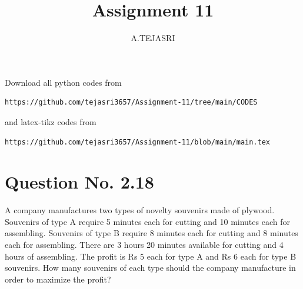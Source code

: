 \documentclass[journal,12pt,twocolumn]{IEEEtran}
\begin{document}
\makeatother
\let\StandardTheFigure\thefigure
\let\vec\mathbf
\renewcommand{\thefigure}{\theproblem}
\def\putbox#1#2#3{\makebox[0in][l]{\makebox[#1][l]{}\raisebox{\baselineskip}[0in][0in]{\raisebox{#2}[0in][0in]{#3}}}}
     \def\rightbox#1{\makebox[0in][r]{#1}}
     \def\centbox#1{\makebox[0in]{#1}}
     \def\topbox#1{\raisebox{-\baselineskip}[0in][0in]{#1}}
     \def\midbox#1{\raisebox{-0.5\baselineskip}[0in][0in]{#1}}
\vspace{3cm}
\title{Assignment 11}
\author{A.TEJASRI}
\maketitle
\newpage
\bigskip
\renewcommand{\thefigure}{\theenumi}
\renewcommand{\thetable}{\theenumi}
Download all python codes from 
\begin{lstlisting}
https://github.com/tejasri3657/Assignment-11/tree/main/CODES
\end{lstlisting}
%
and latex-tikz codes from 
%
\begin{lstlisting}
https://github.com/tejasri3657/Assignment-11/blob/main/main.tex
\end{lstlisting}
%
\section{Question No. 2.18}
A company manufactures two types of novelty souvenirs made of plywood. Souvenirs of type A require 5 minutes each for cutting and 10 minutes each for assembling. Souvenirs of type B require 8 minutes each for cutting and 8 minutes each for assembling. There are 3 hours 20 minutes available for cutting and 4 hours of assembling. The profit is Rs 5 each for type A and Rs 6 each for type B souvenirs. How many souvenirs of each type should the company manufacture in order to maximize the profit?
%
\end{document}
